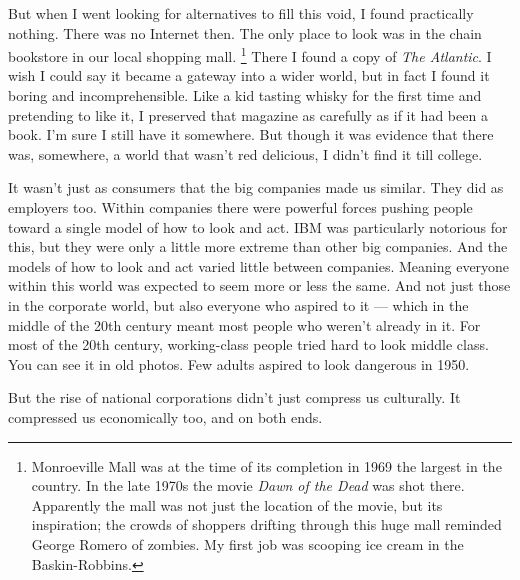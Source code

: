 But when I went looking for alternatives to fill this void, I found
practically nothing. There was no Internet then. The only place to look
was in the chain bookstore in our local shopping mall.
\footnote{Monroeville Mall was at the time of its completion in 1969 the
largest in the country. In the late 1970s the movie \emph{Dawn of the
Dead} was shot there. Apparently the mall was not just the location of
the movie, but its inspiration; the crowds of shoppers drifting through
this huge mall reminded George Romero of zombies. My first job was
scooping ice cream in the Baskin-Robbins.} There I found a copy of \emph{The Atlantic}. I
wish I could say it became a gateway into a wider world, but in fact I
found it boring and incomprehensible. Like a kid tasting whisky for the
first time and pretending to like it, I preserved that magazine as
carefully as if it had been a book. I'm sure I still have it somewhere.
But though it was evidence that there was, somewhere, a world that
wasn't red delicious, I didn't find it till college.

It wasn't just as consumers that the big companies made us similar. They
did as employers too. Within companies there were powerful forces
pushing people toward a single model of how to look and act. IBM was
particularly notorious for this, but they were only a little more
extreme than other big companies. And the models of how to look and act
varied little between companies. Meaning everyone within this world was
expected to seem more or less the same. And not just those in the
corporate world, but also everyone who aspired to it --- which in the
middle of the 20th century meant most people who weren't already in it.
For most of the 20th century, working-class people tried hard to look
middle class. You can see it in old photos. Few adults aspired to look
dangerous in 1950.

But the rise of national corporations didn't just compress us
culturally. It compressed us economically too, and on both ends.

